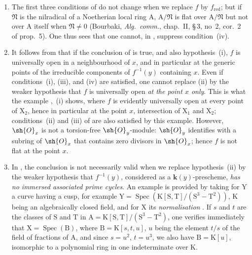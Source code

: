 \begin{remarks}[15.2.4]
\label{IV.15.2.4}
\begin{enumerate}[label=(\roman*)]
  \item The first three conditions of  do not change when we replace $f$ by $f_\mathrm{red}$; but if $\mathfrak{N}$ is the nilradical of a Noetherian local ring $\mathrm{A}$, $\mathrm{A}/\mathfrak{N}$ is flat over $\mathrm{A}/\mathfrak{N}$ but not over $\mathrm{A}$ itself when $\mathfrak{N}\neq 0$ (Bourbaki, \emph{Alg.\ comm.}, chap.~II, \S\,3, no~2, cor.~2 of prop.~5).
One thus sees that one cannot, in , suppress condition~(iv).
  \item It follows from  that if the conclusion of  is true, and also hypothesis~(i), $f$ is universally open in a neighbourhood of $x$, and in particular at the generic points of the irreducible components of $f^{-1}(y)$ containing $x$.
Even if conditions~(i), (iii), and (iv) are satisfied, one cannot replace (ii) by the weaker hypothesis that $f$ is universally open \emph{at the point $x$ only}.
This is what the example ,~(i) shows, where $f$ is evidently universally open at every point of $\mathrm{X}_2$, hence in particular at the point $x$, intersection of $\mathrm{X}_1$ and $\mathrm{X}_2$; conditions~(ii) and (iii) of  are also satisfied by this example.
However, $\sh{O}_x$ is not a torsion-free $\sh{O}_y$-module: $\sh{O}_y$ identifies with a subring of $\sh{O}_x$ that contains zero divisors in $\sh{O}_x$; hence $f$ is not flat at the point $x$.
  \item In , the conclusion is not necessarily valid when we replace hypothesis~(ii) by the weaker hypothesis that $f^{-1}(y)$, considered as a $\mathbf{k}(y)$-prescheme, \emph{has no immersed associated prime cycles}.
An example is provided by taking for $\mathrm{Y}$ a curve having a cusp, for example $\mathrm{Y}=\operatorname{Spec}(\mathrm{K}[\mathrm{S},\mathrm{T}]/(\mathrm{S}^3-\mathrm{T}^2))$, $\mathrm{K}$ being an algebraically closed field, and for $\mathrm{X}$ its \emph{normalisation} .
If $s$ and $t$ are the classes of $\mathrm{S}$ and $\mathrm{T}$ in $\mathrm{A}=\mathrm{K}[\mathrm{S},\mathrm{T}]/(\mathrm{S}^3-\mathrm{T}^2)$, one verifies immediately that $\mathrm{X}=\operatorname{Spec}(\mathrm{B})$, where $\mathrm{B}=\mathrm{K}[s,t,u]$, $u$ being the element $t/s$ of the field of fractions of $\mathrm{A}$, and since $s=u^2$, $t=u^3$, we also have $\mathrm{B}=\mathrm{K}[u]$, isomorphic to a polynomial ring in one indeterminate over $\mathrm{K}$.

\end{enumerate}
\end{remarks}
